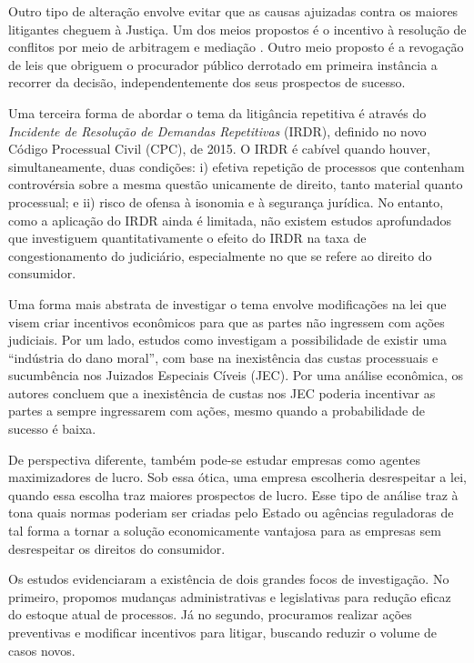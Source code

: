 \documentclass[]{report}
\begin{document}
Outro tipo de alteração envolve evitar que as causas ajuizadas contra os
maiores litigantes cheguem à Justiça. Um dos meios propostos é o
incentivo à resolução de conflitos por meio de arbitragem e mediação
\citep{Asperti2014}. Outro meio proposto é a revogação de leis que
obriguem o procurador público derrotado em primeira instância a recorrer
da decisão, independentemente dos seus prospectos de sucesso.

Uma terceira forma de abordar o tema da litigância repetitiva é através
do \emph{Incidente de Resolução de Demandas Repetitivas} (IRDR),
definido no novo Código Processual Civil (CPC), de 2015. O IRDR é
cabível quando houver, simultaneamente, duas condições: i) efetiva
repetição de processos que contenham controvérsia sobre a mesma questão
unicamente de direito, tanto material quanto processual; e ii) risco de
ofensa à isonomia e à segurança jurídica. No entanto, como a aplicação
do IRDR ainda é limitada, não existem estudos aprofundados que
investiguem quantitativamente o efeito do IRDR na taxa de
congestionamento do judiciário, especialmente no que se refere ao
direito do consumidor.

Uma forma mais abstrata de investigar o tema envolve modificações na lei
que visem criar incentivos econômicos para que as partes não ingressem
com ações judiciais. Por um lado, estudos como \citep{Athos2015}
investigam a possibilidade de existir uma ``indústria do dano moral'',
com base na inexistência das custas processuais e sucumbência nos
Juizados Especiais Cíveis (JEC). Por uma análise econômica, os autores
concluem que a inexistência de custas nos JEC poderia incentivar as
partes a sempre ingressarem com ações, mesmo quando a probabilidade de
sucesso é baixa.

De perspectiva diferente, também pode-se estudar empresas como agentes
maximizadores de lucro. Sob essa ótica, uma empresa escolheria
desrespeitar a lei, quando essa escolha traz maiores prospectos de
lucro. Esse tipo de análise traz à tona quais normas poderiam ser
criadas pelo Estado ou agências reguladoras de tal forma a tornar a
solução economicamente vantajosa para as empresas sem desrespeitar os
direitos do consumidor.

Os estudos evidenciaram a existência de dois grandes focos de
investigação. No primeiro, propomos mudanças administrativas e
legislativas para redução eficaz do estoque atual de processos. Já no
segundo, procuramos realizar ações preventivas e modificar incentivos
para litigar, buscando reduzir o volume de casos novos.
\end{document}
